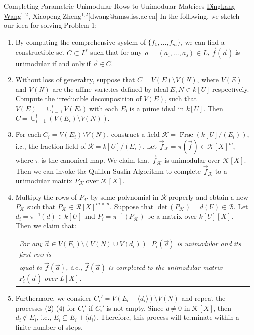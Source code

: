 \begin{abstract_online}{Completing Parametric Unimodular Rows to Unimodular Matrices}{%
        \underline{Dingkang Wang}$^{1,2}$, Xiaopeng Zheng$^{1,2}$}{[dwang@amss.iss.ac.cn]
        }
In the following, we sketch our idea for solving Problem 1: 
\vspace{-0.4cm}
\begin{enumerate}
	\item[(1)] By computing the comprehensive \gr system of $\{f_1,\ldots,f_m\}$, we can find a constructible set $C \subset L^s$ such that for any $\vec{a} = (a_1,\ldots,a_s) \in L$, $\vec{f}(\vec{a})$ is unimodular if and only if $\vec{a} \in C$. 
	\item[(2)] Without loss of generality, suppose that $C = V(E)\setminus V(N)$, where $V(E)$ and $V(N)$ are the affine varieties defined by ideal $E,N\subset k[U]$ respectively. Compute the irreducible decomposition of $V(E)$, such that $V(E) = \cup_{i = 1}^lV(E_i)$ with each $E_i$ is a prime ideal in $k[U]$. Then $C = \cup_{i=1}^l\left(V(E_i)\setminus V(N)\right)$.
	\item[(3)] For each $C_i = V(E_i)\setminus V(N)$, construct a field $\mathcal{K} = \operatorname{Frac}(k[U]/(E_i))$, i.e., the fraction field of $\mathcal{R} = k[U]/(E_i)$. Let $\vec{f}_\mathcal{K} = \pi(\vec{f})\in \mathcal{K}[X]^{m}$, where $\pi$ is the canonical map. We claim that $\vec{f}_\mathcal{K}$ is unimodular over $\mathcal{K}[X]$. Then we can invoke the Quillen-Suslin Algorithm to complete $\vec{f}_\mathcal{K}$ to a unimodular matrix $P_{\mathcal{K}}$ over $\mathcal{K}[X]$.      
	\item[(4)] Multiply the rows of $P_{\mathcal{K}}$ by some polynomial in $\mathcal{R}$ properly and obtain a new $P_{\mathcal{K}}$ such that $P_{\mathcal{K}} \in \mathcal{R}[X]^{m \times m}$. Suppose that $\det(P_{\mathcal{K}}) = d(U) \in \mathcal{R}$. Let $d_i=\pi^{-1}(d)\in k[U]$ and $P_i = \pi^{-1}(P_{\mathcal{K}})$ be a matrix over $k[U][X]$. Then we claim that:
	\vspace{-0.1cm}
	\begin{center}
		\begin{tabular}{l}
			\itshape For any $\vec{a}\in V(E_i)\setminus (V(N)\cup V(d_i))$, $P_i(\vec{a})$ is unimodular and its first row is\\
			\itshape equal to $\vec{f}(\vec{a})$, i.e., $\vec{f}(\vec{a})$ is completed to the unimodular matrix $P_i(\vec{a})$ over $L[X]$.
		\end{tabular}
	\end{center}
\vspace{-0.3cm}
	\item[(4)]  Furthermore, we consider $C_i' = V(E_i+\langle d_i \rangle)\setminus V(N)$ and repeat the processes (2)-(4) for $C_i'$ if $C_i'$ is not empty. Since $d \neq 0$ in $\mathcal{K}[X]$, then $d_i \notin E_i$, i.e., $E_i \subsetneq E_i+\langle d_i \rangle$. Therefore, this process will terminate within a finite number of steps.

\end{enumerate}
\end{abstract_online}
